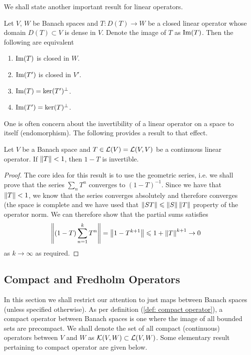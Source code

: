 \documentclass{article}
\begin{document}
We shall state another important result for linear operators. 
\begin{ftheorem} Let $V$, $W$ be Banach spaces and $T: D(T) \to W$ be a closed linear operator whose domain $D(T) \subset V$ is dense in $V$.  Denote the image of $T$ as $\im(T)$. Then the following are equivalent
\begin{enumerate}
\item $\im(T)$ is closed in $W$. 
\item $\im(T')$ is closed in $V'$. 
\item $\im(T) = \ker(T')^\perp$.
\item $\im(T') = \ker(T)^\perp$. 
\end{enumerate}
\end{ftheorem}


One is often concern about the invertibility of a linear operator on a space to itself (endomorphism). The following provides a result to that effect. 
\begin{flemma} Let $V$ be a Banach space and $T \in \L(V) = \L(V, V)$ be a continuous linear operator. If $\norm[T] < 1$, then $1 - T$ is invertible.  

\begin{proof} The core idea for this result is to use the geometric series, i.e. we shall prove that the series $\sum_n T^n$ converges to $(1 - T)^{-1}$. Since we have that $\norm[T] < 1$, we know that the series converges absolutely and therefore converges (the space is complete and we have used that $\norm[ST] \leq \norm[S]\norm[T]$ property of the operator norm. We can therefore show that the partial sums satisfies
\begin{align*}
\norm[(1 - T) \sum_{n = 1}^k T^n] = \norm[1 - T^{k + 1} ] \leq 1 + \norm[T]^{k + 1} \to 0
\end{align*}
as $k \to \infty$ as required. 
\end{proof}

\end{flemma}


\subsection{Compact and Fredholm Operators}
In this section we shall restrict our attention to just maps between Banach spaces (unless specified otherwise). As per definition (\ref{def: compact operator}), a compact operator between Banach spaces is one where the image of all bounded sets are precompact. We shall denote the set of all compact (continuous) operators between $V$ and $W$ as $\K(V, W) \subset \L(V, W)$. Some elementary result pertaining to compact operator are given below. 
\end{document}
